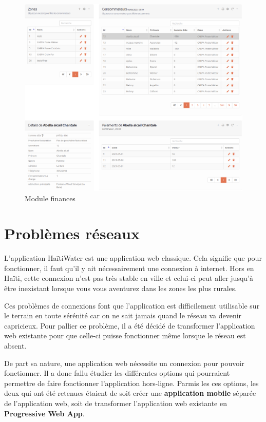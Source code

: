 \documentclass{EPL-master-thesis-covers-FR}
\begin{document}
				\begin{figure}[H]
					\centering
					\includegraphics[width=1\textwidth]{images/finances}
					\caption{Module finances}
				\end{figure}
				
				
		\section{Problèmes réseaux}
			L'application HaïtiWater est une application web classique. Cela signifie que pour fonctionner, il faut qu'il y ait nécessairement une connexion à internet. Hors en Haïti, cette connexion n'est pas très stable en ville et celui-ci peut aller jusqu'à être inexistant lorsque vous vous aventurez dans les zones les plus rurales. 
			
			Ces problèmes de connexions font que l'application est difficilement utilisable sur le terrain en toute sérénité car on ne sait jamais quand le réseau va devenir capricieux. Pour pallier ce problème, il a été décidé de transformer l'application web existante pour que celle-ci puisse fonctionner même lorsque le réseau est absent.
				
			De part sa nature, une application web nécessite un connexion pour pouvoir fonctionner. Il a donc fallu étudier les différentes options qui pourraient permettre de faire fonctionner l'application hors-ligne. Parmis les ces options,  les deux qui ont été retenues étaient de soit créer une \textbf{application mobile} séparée de l'application web, soit de transformer l'application web existante en \textbf{Progressive Web App}. 
				
\end{document}
